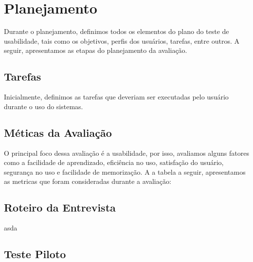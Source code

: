 \begin{figure}[H]
    \centering
\end{figure}

\section{Planejamento}

Durante o planejamento, definimos todos os elementos do plano do teste de usabilidade, tais como os objetivos, perfis dos usuários, tarefas, entre outros. A seguir, apresentamos as etapas do planejamento da avaliação.

\subsection{Tarefas}

Inicialmente, definimos as tarefas que deveriam ser executadas pelo usuário durante o uso do sistemas. 

\subsection{Méticas da Avaliação}

O principal foco dessa avaliação é a usabilidade, por isso, avaliamos alguns fatores
como a facilidade de aprendizado, eficiência no uso, satisfação do usuário, segurança no uso e facilidade de memorização. A a tabela a seguir, apresentamos as metricas que foram consideradas durante a avaliação:


\subsection{Roteiro da Entrevista}
asda


\subsection{Teste Piloto}

